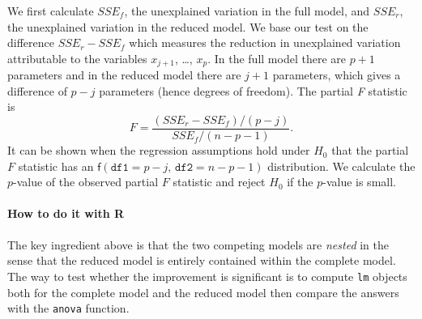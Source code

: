 \documentclass[captions=tableheading]{scrbook}
\begin{document}
We first calculate \(SSE_{f}\), the unexplained variation in the full model, and \(SSE_{r}\), the unexplained variation in the reduced model. We base our test on the difference \(SSE_{r}-SSE_{f}\) which measures the reduction in unexplained variation attributable to the variables \(x_{j+1}\), \ldots{}, \(x_{p}\). In the full model there are \(p+1\) parameters and in the reduced model there are \(j+1\) parameters, which gives a difference of \(p-j\) parameters (hence degrees of freedom). The partial \emph{F} statistic is 
\begin{equation}
F=\frac{(SSE_{r}-SSE_{f})/(p-j)}{SSE_{f}/(n-p-1)}.
\end{equation}
It can be shown when the regression assumptions hold under \(H_{0}\) that the partial \(F\) statistic has an \(\mathsf{f}(\mathtt{df1}=p-j,\,\mathtt{df2}=n-p-1)\) distribution. We calculate the \(p\)-value of the observed partial \(F\) statistic and reject \(H_{0}\) if the \(p\)-value is small. 


\paragraph*{How to do it with \textsf{R}}

The key ingredient above is that the two competing models are \emph{nested} in the sense that the reduced model is entirely contained within the complete model. The way to test whether the improvement is significant is to compute \texttt{lm} objects both for the complete model and the reduced model then compare the answers with the \texttt{anova} function.
\end{document}
